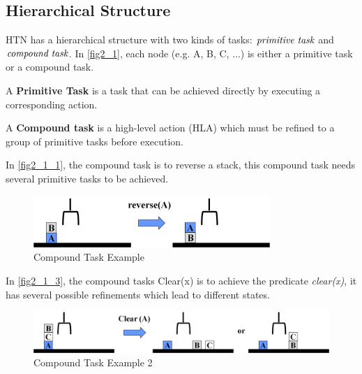 \subsection{Hierarchical Structure}
HTN has a hierarchical structure with two kinds of tasks: $\emph{primitive task}$ and $\emph{compound task}$. In \autoref{fig2_1}, each node (e.g. A, B, C, $\ldots$) is either a primitive task or a compound task. 

A \textbf{Primitive Task} is a task that can be achieved directly by executing a corresponding action.

A \textbf{Compound task} is a high-level action (HLA) which must be refined to a group of primitive tasks before execution.

\label{compound_task_example}
In \autoref{fig2_1_1}, the compound task is to reverse a stack, this compound task needs several primitive tasks to be achieved.

\begin{figure}[H]
    \center
    \includegraphics[width=0.8\textwidth]{./images/2_1_1.png}
    \caption{Compound Task Example}
    \label{fig2_1_1}
\end{figure}



In \autoref{fig2_1_3}, the compound tasks Clear(x) is to achieve the predicate {\em clear(x)}, it has several possible refinements which lead to different states.

\begin{figure}[H]
    \center
    \includegraphics[width=\textwidth]{./images/2_1_3.png}
    \caption{Compound Task Example 2}
    \label{fig2_1_3}
\end{figure}

